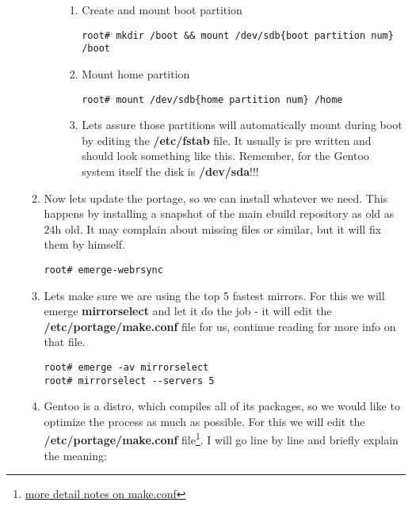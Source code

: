 \documentclass[10pt,a4paper]{article}
\begin{document}
\begin{enumerate}
\begin{enumerate}[label*=\arabic*.]
\begin{enumerate}[label*=\arabic*.]
\begin{enumerate}[label*=\arabic*.]
					\item Create and mount boot partition

					\begin{lstlisting}[style=BashInputRoot]
root# mkdir /boot && mount /dev/sdb{boot partition num} /boot
					\end{lstlisting}
					
					\item Mount home partition

					\begin{lstlisting}[style=BashInputRoot]
root# mount /dev/sdb{home partition num} /home					
					\end{lstlisting}
				
					\item Lets assure those partitions will automatically mount during boot by editing the \textbf{/etc/fstab} file. It usually is pre written and should look something like this. Remember, for the Gentoo system itself the disk is \textbf{/dev/sda}!!!



				\end{enumerate}
			
			\end{enumerate}
				
			\item Now lets update the portage, so we can install whatever we need. This happens by installing a snapshot of the main ebuild repository as old as $ 24\mbox{h} $ old. It may complain about missing files or similar, but it will fix them by himself. 
			\begin{lstlisting}[style=BashInputRoot]					
root# emerge-webrsync				
			\end{lstlisting}
			
			\item Lets make sure we are using the top 5 fastest mirrors. For this we will emerge \textbf{mirrorselect} and let it do the job - it will edit the \textbf{/etc/portage/make.conf} file for us, continue reading for more info on that file.
			\begin{lstlisting}[style=BashInputRoot]					
root# emerge -av mirrorselect
root# mirrorselect --servers 5
			\end{lstlisting}

			\item Gentoo is a distro, which compiles all of its packages, so we would like to optimize the process as much as possible. For this we will edit the \textbf{/etc/portage/make.conf} file\footnote{ \href{https://wiki.gentoo.org/wiki//etc/portage/make.conf}{more detail notes on make.conf}}. I will go line by line and briefly explain the meaning:
			

\end{enumerate}
\end{enumerate}
\end{document}
